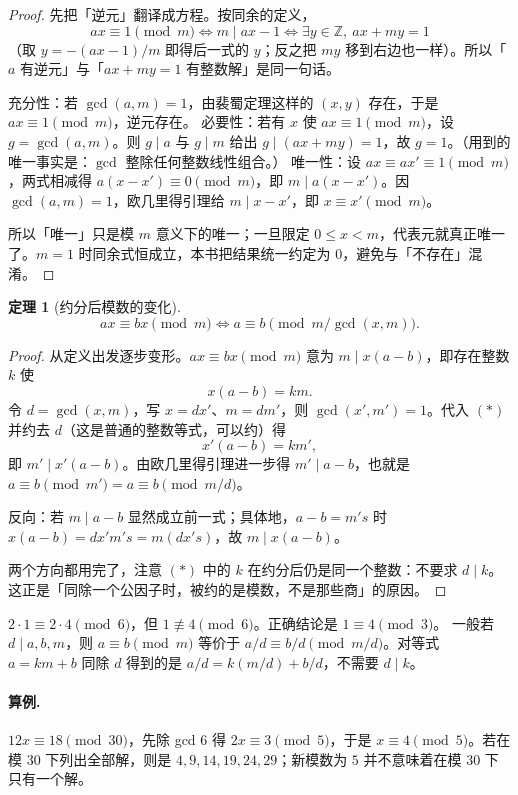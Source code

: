 \documentclass[UTF8,a4paper,11pt,oneside,openany,fontset=fandol]{ctexbook}
\theoremstyle{definition}
\newtheorem{theorem}[definition]{定理}
\newcommand{\Z}{\mathbb Z}
\begin{document}
\begin{proof}
先把「逆元」翻译成方程。按同余的定义，
\[
 ax\equiv1\pmod m\iff m\mid ax-1\iff \exists y\in\Z,\ ax+my=1
\]
（取 $y=-(ax-1)/m$ 即得后一式的 $y$；反之把 $my$ 移到右边也一样）。所以「$a$ 有逆元」与「$ax+my=1$ 有整数解」是同一句话。

充分性：若 $\gcd(a,m)=1$，由裴蜀定理这样的 $(x,y)$ 存在，于是 $ax\equiv1\pmod m$，逆元存在。
必要性：若有 $x$ 使 $ax\equiv1\pmod m$，设 $g=\gcd(a,m)$。则 $g\mid a$ 与 $g\mid m$ 给出 $g\mid(ax+my)=1$，故 $g=1$。（用到的唯一事实是：$\gcd$ 整除任何整数线性组合。）
唯一性：设 $ax\equiv ax'\equiv1\pmod m$，两式相减得 $a(x-x')\equiv0\pmod m$，即 $m\mid a(x-x')$。因 $\gcd(a,m)=1$，欧几里得引理给 $m\mid x-x'$，即 $x\equiv x'\pmod m$。

所以「唯一」只是模 $m$ 意义下的唯一；一旦限定 $0\le x<m$，代表元就真正唯一了。$m=1$ 时同余式恒成立，本书把结果统一约定为 $0$，避免与「不存在」混淆。
\end{proof}
\begin{theorem}[约分后模数的变化]
\[
 ax\equiv bx\pmod m
 \iff a\equiv b\pmod{m/\gcd(x,m)}.
\]
\end{theorem}
\begin{proof}
从定义出发逐步变形。$ax\equiv bx\pmod m$ 意为 $m\mid x(a-b)$，即存在整数 $k$ 使
\[
 x(a-b)=km. \tag{$\ast$}
\]
令 $d=\gcd(x,m)$，写 $x=dx'$、$m=dm'$，则 $\gcd(x',m')=1$。代入 $(\ast)$ 并约去 $d$（这是普通的整数等式，可以约）得
\[
 x'(a-b)=km',
\]
即 $m'\mid x'(a-b)$。由欧几里得引理进一步得 $m'\mid a-b$，也就是 $a\equiv b\pmod{m'}=a\equiv b\pmod{m/d}$。

反向：若 $m\mid a-b$ 显然成立前一式；具体地，$a-b=m's$ 时 $x(a-b)=dx'm's=m(dx's)$，故 $m\mid x(a-b)$。

两个方向都用完了，注意 $(\ast)$ 中的 $k$ 在约分后仍是同一个整数：不要求 $d\mid k$。这正是「同除一个公因子时，被约的是模数，不是那些商」的原因。
\end{proof}

\begin{pitfall}[把整数除法直接搬到同余式中会出错]
$2\cdot1\equiv2\cdot4\pmod6$，但 $1\not\equiv4\pmod6$。正确结论是 $1\equiv4\pmod3$。
一般若 $d\mid a,b,m$，则 $a\equiv b\pmod m$ 等价于 $a/d\equiv b/d\pmod{m/d}$。对等式 $a=km+b$ 同除 $d$ 得到的是 $a/d=k(m/d)+b/d$，不需要 $d\mid k$。
\end{pitfall}
\paragraph{算例.} $12x\equiv18\pmod{30}$，先除 gcd $6$ 得 $2x\equiv3\pmod5$，于是 $x\equiv4\pmod5$。若在模 $30$ 下列出全部解，则是 $4,9,14,19,24,29$；新模数为 $5$ 并不意味着在模 $30$ 下只有一个解。
\end{document}
